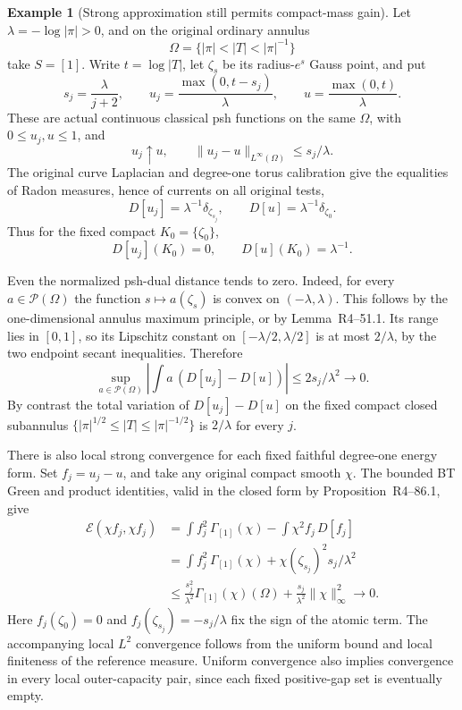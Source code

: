 \documentclass[11pt,a4paper]{article}
\numberwithin{equation}{section}
\theoremstyle{definition}
\newtheorem{example}[theorem]{Example}
\theoremstyle{remark}
\begin{document}
\begin{example}[Strong approximation still permits compact-mass gain]
\label{ex:r5-annulus-compact-mass-jump}
Let $\lambda=-\log|\pi|>0$, and on the original ordinary
annulus
\[
            \Omega=\{|\pi|<|T|<|\pi|^{-1}\}
\]
take $S=[1]$.  Write $t=\log|T|$, let $\zeta_s$ be its
radius-$e^s$ Gauss point, and put
\[
 s_j=\frac{\lambda}{j+2},\qquad
 u_j=\frac{\max(0,t-s_j)}{\lambda},\qquad
 u=\frac{\max(0,t)}{\lambda}.
\]
These are actual continuous classical psh functions on the
same $\Omega$, with $0\le u_j,u\le1$, and
\[
        u_j\uparrow u,\qquad
        \|u_j-u\|_{L^\infty(\Omega)}\le s_j/\lambda.
\]
The original curve Laplacian and degree-one torus calibration
give the equalities of Radon measures, hence of currents on
all original tests,
\[
           D[u_j]=\lambda^{-1}\delta_{\zeta_{s_j}},
           \qquad D[u]=\lambda^{-1}\delta_{\zeta_0}.
\]
Thus for the fixed compact $K_0=\{\zeta_0\}$,
\begin{equation}
               D[u_j](K_0)=0,
               \qquad D[u](K_0)=\lambda^{-1}.
 \label{eq:r5-annulus-compact-jump}
\end{equation}

Even the normalized psh-dual distance tends to zero.  Indeed,
for every $a\in\mathcal P(\Omega)$ the function
$s\mapsto a(\zeta_s)$ is convex on $(-\lambda,\lambda)$.
This follows by the one-dimensional annulus maximum principle,
or by Lemma~\textup{R4--51.1}.  Its range
lies in $[0,1]$, so its Lipschitz constant on
$[-\lambda/2,\lambda/2]$ is at most $2/\lambda$, by the
two endpoint secant inequalities.  Therefore
\[
 \sup_{a\in\mathcal P(\Omega)}
       \left|\int a\,(D[u_j]-D[u])\right|
                       \le 2s_j/\lambda^2\longrightarrow0.
\]
By contrast the total variation of $D[u_j]-D[u]$ on the
fixed compact closed subannulus
$\{|\pi|^{1/2}\le|T|\le|\pi|^{-1/2}\}$ is $2/\lambda$
for every $j$.

There is also local strong convergence for each fixed faithful
degree-one energy form.  Set $f_j=u_j-u$, and take any original
compact smooth $\chi$.  The bounded BT Green and product
identities, valid in the closed form by
Proposition~\textup{R4--86.1}, give
\[
 \begin{split}
 \mathcal E(\chi f_j,\chi f_j)
   &=\int f_j^2\,\Gamma_{[1]}(\chi)
                     -\int\chi^2 f_j\,D[f_j]\\
   &=\int f_j^2\,\Gamma_{[1]}(\chi)
                       +\chi(\zeta_{s_j})^2s_j/\lambda^2\\
   &\le \frac{s_j^2}{\lambda^2}
                       \Gamma_{[1]}(\chi)(\Omega)
           +\frac{s_j}{\lambda^2}\|\chi\|_\infty^2
                       \longrightarrow0.
 \end{split}
\]
Here $f_j(\zeta_0)=0$ and
$f_j(\zeta_{s_j})=-s_j/\lambda$ fix the sign of the atomic
term.  The accompanying local $L^2$ convergence follows from
the uniform bound and local finiteness of the reference
measure.  Uniform convergence also implies convergence in
every local outer-capacity pair, since each fixed positive-gap
set is eventually empty.
\end{example}
\end{document}
